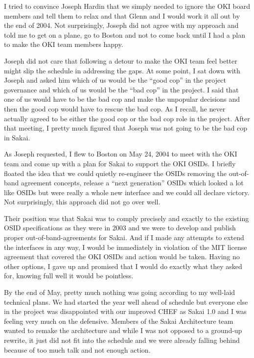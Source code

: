 \documentclass[12pt]{book}
\begin{document}
I tried to convince Joseph Hardin that we simply needed to ignore the
OKI board members and tell them to relax and that Glenn and I would work
it all out by the end of 2004.  Not surprisingly, Joseph did not agree
with my approach and told me to get on a plane, go to Boston and not
to come back until I had a plan to make the OKI team members happy.

Joseph did not care that following a detour to make the OKI
team feel better might slip the schedule in addressing
the gaps.  At some point, I sat down with Joseph and
asked him which of us would be the ``good cop''
in the project governance and which of us would be the
``bad cop'' in the project.  I said that one of us
would have to be the bad cop and make the unpopular
decisions and then the good cop would have to rescue
the bad cop.  As I recall, he never actually agreed to be either the
good cop or the bad cop role in the project.  After that meeting, I
pretty much figured that Joseph was not going to be the bad cop in Sakai.

As Joseph requested, I flew to Boston on May 24, 2004 to meet with the OKI
team and come up with a plan for Sakai to support the OKI OSIDs.  I briefly
floated the idea that we could quietly re-engineer the OSIDs removing the
out-of-band agreement concepts, release a ``next generation'' OSIDs which
looked a lot like OSIDs but were really a whole new interface and we
could all declare victory.  Not surprisingly, this approach did not go
over well.

Their position was that Sakai was to comply precisely and exactly to the
existing OSID specifications as they were in 2003 and
we were to develop and publish proper out-of-band-agreements
for Sakai.  And if I made any attempts to extend
the interfaces in any way, I would be immediately in violation of the
MIT license agreement that covered the OKI OSIDs and action would be taken.
Having no other options, I gave up and promised that I would do
exactly what they asked for, knowing full well it would be pointless.

By the end of May, pretty much nothing was going according to
my well-laid technical plans.  We had started the year well
ahead of schedule but everyone else in the project was
disappointed with our improved CHEF as Sakai 1.0 and I was
feeling very much on the defensive.  Members of the Sakai
Architecture team wanted to remake the architecture and while
I was not opposed to a ground-up rewrite, it just did not
fit into the schedule and we were already falling behind
because of too much talk and not enough action.
\end{document}
